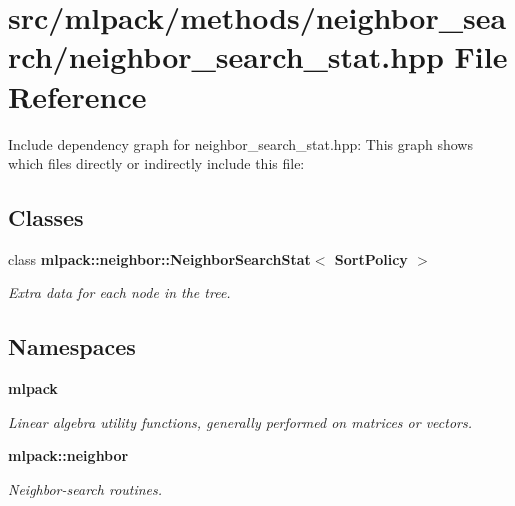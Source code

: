 \section{src/mlpack/methods/neighbor\-\_\-search/neighbor\-\_\-search\-\_\-stat.hpp File Reference}
\label{neighbor__search__stat_8hpp}
Include dependency graph for neighbor\-\_\-search\-\_\-stat.\-hpp\-:
This graph shows which files directly or indirectly include this file\-:
\subsection*{Classes}
\begin{DoxyCompactItemize}
\item 
class {\bf mlpack\-::neighbor\-::\-Neighbor\-Search\-Stat$<$ Sort\-Policy $>$}
\begin{DoxyCompactList}\small\item\em Extra data for each node in the tree. \end{DoxyCompactList}\end{DoxyCompactItemize}
\subsection*{Namespaces}
\begin{DoxyCompactItemize}
\item 
{\bf mlpack}
\begin{DoxyCompactList}\small\item\em Linear algebra utility functions, generally performed on matrices or vectors. \end{DoxyCompactList}\item 
{\bf mlpack\-::neighbor}
\begin{DoxyCompactList}\small\item\em Neighbor-\/search routines. \end{DoxyCompactList}\end{DoxyCompactItemize}
